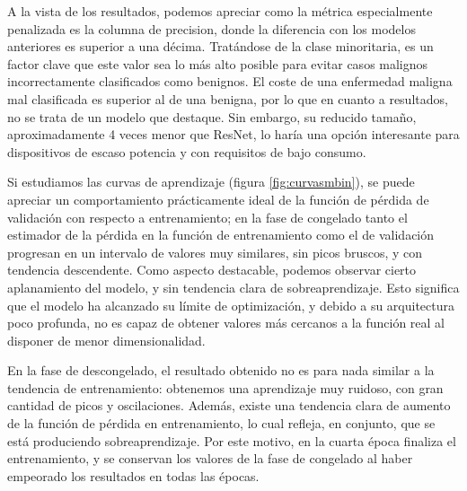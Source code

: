 A la vista de los resultados, podemos apreciar como la métrica especialmente penalizada es la columna de precision, donde la diferencia con los modelos anteriores es superior a una décima. Tratándose de la clase minoritaria, es un factor clave que este valor sea lo más alto posible para evitar casos malignos incorrectamente clasificados como benignos. El coste de una enfermedad maligna mal clasificada es superior al de una benigna, por lo que en cuanto a resultados, no se trata de un modelo que destaque. Sin embargo, su reducido tamaño, aproximadamente 4 veces menor que ResNet, lo haría una opción interesante para dispositivos de escaso potencia y con requisitos de bajo consumo.

Si estudiamos las curvas de aprendizaje (figura \ref{fig:curvasmbin}), se puede apreciar un comportamiento prácticamente ideal de la función  de pérdida de validación con respecto a entrenamiento; en la fase de congelado tanto el estimador de la pérdida en la función de entrenamiento como el de validación progresan en un intervalo de valores muy similares, sin picos bruscos, y con tendencia descendente. Como aspecto destacable, podemos observar cierto aplanamiento del modelo, y sin tendencia clara de sobreaprendizaje. Esto significa que el modelo ha alcanzado su límite de optimización, y debido a su arquitectura poco profunda, no es capaz de obtener valores más cercanos a la función real al disponer de menor dimensionalidad.

En la fase de descongelado, el resultado obtenido no es para nada similar a la tendencia de entrenamiento: obtenemos una aprendizaje muy ruidoso, con gran cantidad de picos y oscilaciones. Además, existe una tendencia clara de aumento de la función de pérdida en entrenamiento, lo cual refleja, en conjunto, que se está produciendo sobreaprendizaje. Por este motivo, en la cuarta época finaliza el entrenamiento, y se conservan los valores de la fase de congelado al haber empeorado los resultados en todas las épocas.


